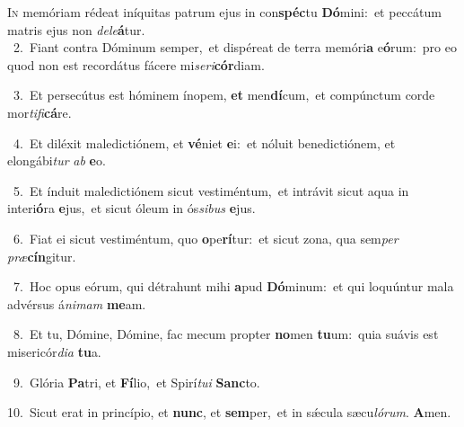 \lettrine{\initial\textcolor{\initialcolor}{I}}{n} memóriam rédeat iníquitas patrum ejus in con\-\textbf{spéc}\-tu \textbf{Dó}\-mini:~\star et peccátum matris ejus non \textit{de}\-\textit{le}\textbf{á}tur.\\
{\numbfont\textcolor{\numbcolor}{~2.}}~Fiant contra Dóminum semper,~\dagger et dispéreat de terra memóri\textbf{a} e\-\textbf{ó}\-rum:~\star pro eo quod non est recordátus fácere mi\-\textit{se}\-\textit{ri}\textbf{cór}diam.\par
{\numbfont\textcolor{\numbcolor}{~3.}}~Et persecútus est hóminem ínopem, \textbf{et} men\-\textbf{dí}\-cum,~\star et compúnctum corde mor\-\textit{ti}\-\textit{fi}\textbf{cá}re.\par
{\numbfont\textcolor{\numbcolor}{~4.}}~Et diléxit maledictiónem, et \textbf{vé}\-niet \textbf{e}\-i:~\star et nóluit benedictiónem, et elongábi\textit{tur} \textit{ab} \textbf{e}\-o.\par
{\numbfont\textcolor{\numbcolor}{~5.}}~Et índuit maledictiónem sicut vestiméntum,~\dagger et intrávit sicut aqua in interi\-\textbf{ó}\-ra \textbf{e}\-jus,~\star et sicut óleum in ós\-\textit{si}\-\textit{bus} \textbf{e}\-jus.\par
{\numbfont\textcolor{\numbcolor}{~6.}}~Fiat ei sicut vestiméntum, quo \textbf{o}\-pe\-\textbf{rí}\-tur:~\star et sicut zona, qua sem\textit{per} \textit{præ}\-\textbf{cín}gitur.\par
{\numbfont\textcolor{\numbcolor}{~7.}}~Hoc opus eórum, qui détrahunt mihi \textbf{a}\-pud \textbf{Dó}\-minum:~\star et qui loquúntur mala advérsus á\-\textit{ni}\-\textit{mam} \textbf{me}\-am.\par
{\numbfont\textcolor{\numbcolor}{~8.}}~Et tu, Dómine, Dómine, fac mecum propter \textbf{no}\-men \textbf{tu}\-um:~\star quia suávis est misericór\-\textit{di}\-\textit{a} \textbf{tu}\-a.\par
{\numbfont\textcolor{\numbcolor}{~9.}}~Glória \textbf{Pa}\-tri, et \textbf{Fí}\-lio,~\star et Spirí\-\textit{tu}\-\textit{i} \textbf{Sanc}\-to.\par
{\numbfont\textcolor{\numbcolor}{10.}}~Sicut erat in princípio, et \textbf{nunc}\-, et \textbf{sem}\-per,~\star et in sǽcula sæcu\-\textit{ló}\-\textit{rum}. \textbf{A}\-men.\par
